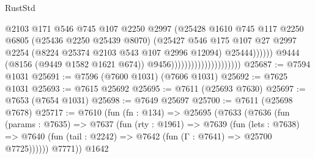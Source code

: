 \begin{lexlean}{RustStd}
\begin{coremodule}
                                                      @2103
                                                      @171
                                                      @546
                                                      @745
                                                      @107
                                                      @2250
                                                      @2997
                                                      (@25428
                                                        @1610
                                                        @745
                                                        @117
                                                        @2250
                                                        @6805
                                                        (@25436 @2250 @25439 @8070)
                                                        (@25427
                                                          @546
                                                          @175
                                                          @107
                                                          @27
                                                          @2997
                                                          @2254
                                                          (@8224
                                                            @25374
                                                            @2103
                                                            @543
                                                            @107
                                                            @2996
                                                            @12094)
                                                          @25444))))))
                                              @9444
                                              (@8156 (@9449 @1582 @1621 @674))
                                              @9456)))))))))))))))))))))
@25687 := @7594 @1031
@25691 := @7596 (@7600 @1031) (@7606 @1031)
@25692 := @7625 @1031
@25693 := @7615 @25692
@25695 := @7611 (@25693 @7630)
@25697 := @7653 (@7654 @1031)
@25698 := @7649 @25697
@25700 := @7611 (@25698 @7678)
@25717 := @7610
    (fun (fn : @134) =>
    @25695
      (@7633
        (@7636
          (fun (params : @7635) =>
          @7637
            (fun (rty : @1961) =>
            @7639
              (fun (lets : @7638) =>
              @7640 (fun (tail : @2242) => @7642 (fun (Γ : @7641) => @25700 @7725))))))
        @7771))
    @1642

\end{coremodule}
\end{lexlean}
